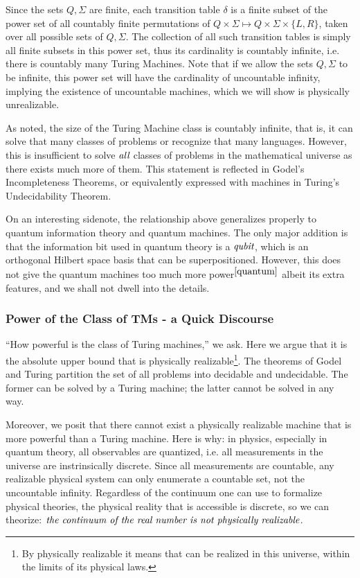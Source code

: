 \documentclass[12pt]{article}  %
\begin{document}
Since the sets $Q, \Sigma$ are finite, each transition table $\delta$ is a finite subset of the power set of all countably finite permutations of $Q \times \Sigma \mapsto Q \times \Sigma \times \{L, R\}$, taken over all possible sets of $Q, \Sigma$. The collection of all such transition tables is simply all finite subsets in this power set, thus its cardinality is countably infinite, i.e. there is countably many Turing Machines. Note that if we allow the sets $Q, \Sigma$ to be infinite, this power set will have the cardinality of uncountable infinity, implying the existence of uncountable machines, which we will show is physically unrealizable.

As noted, the size of the Turing Machine class is countably infinite, that is, it can solve that many classes of problems or recognize that many languages. However, this is insufficient to solve $\emph{all}$ classes of problems in the mathematical universe as there exists much more of them. This statement is reflected in Godel's Incompleteness Theorems, or equivalently expressed with machines in Turing's Undecidability Theorem.

On an interesting sidenote, the relationship above generalizes properly to quantum information theory and quantum machines. The only major addition is that the information bit used in quantum theory is a $\emph{qubit}$, which is an orthogonal Hilbert space basis that can be superpositioned. However, this does not give the quantum machines too much more power$^{\ref{quantum}}$ albeit its extra features, and we shall not dwell into the details.





\subsubsection{Power of the Class of TMs - a Quick Discourse}
``How powerful is the class of Turing machines,'' we ask. Here we argue that it is the absolute upper bound that is physically realizable\footnote{By physically realizable it means that can be realized in this universe, within the limits of its physical laws.}. The theorems of Godel and Turing partition the set of all problems into decidable and undecidable. The former can be solved by a Turing machine; the latter cannot be solved in any way.

Moreover, we posit that there cannot exist a physically realizable machine that is more powerful than a Turing machine. Here is why: in physics, especially in quantum theory, all observables are quantized, i.e. all measurements in the universe are instrinsically discrete. Since all measurements are countable, any realizable physical system can only enumerate a countable set, not the uncountable infinity. Regardless of the continuum one can use to formalize physical theories, the physical reality that is accessible is discrete, so we can theorize: $\emph{the continuum of the real number is not physically realizable}$.
\end{document}
